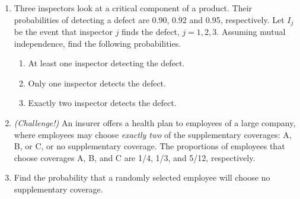 \documentclass{article}
\begin{document}
\begin{enumerate}
    \item Three inspectors look at a critical component of a product. Their probabilities of detecting a defect are 0.90, 0.92 and 0.95, respectively. Let $I_j$ be the event that inspector $j$ finds the defect, $j = 1, 2, 3$. Assuming mutual independence, find the following probabilities.
    \begin{enumerate}
        \item At least one inspector detecting the defect.\vspace{90pt}
        \item Only one inspector detects the defect.\vspace{90pt}
        \item Exactly two inspector detects the defect.\vspace{90pt}
    \end{enumerate}
    
    \item \textit{(Challenge!)} An insurer offers a health plan to employees of a large company, where employees may choose \textit{exactly two} of the supplementary coverages: A, B, or C, or no supplementary coverage. The proportions of employees that choose coverages A, B, and C are 1/4, 1/3, and 5/12, respectively.%
    \item[] Find the probability that a randomly selected employee will choose no supplementary coverage.\vspace{150pt}
\end{enumerate}
\end{document}
